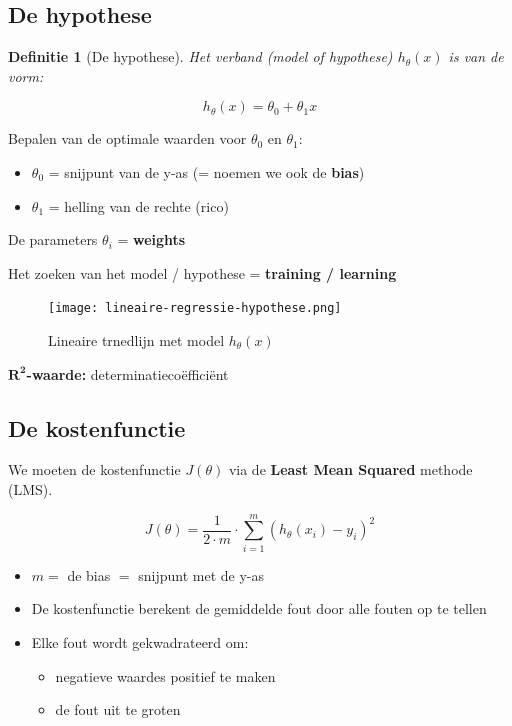 \documentclass{article}
\newtheorem{theorem}{Definitie}[section]
\begin{document}
\subsection{De hypothese}

\begin{theorem}[De hypothese]
Het verband (model of hypothese) $h_{\theta}(x)$ is van de vorm:

\begin{equation}
h_{\theta}(x) = \theta_0 + \theta_1x
\end{equation}
\end{theorem}

Bepalen van de optimale waarden voor $\theta_0$ en $\theta_1$:

\begin{itemize}
    \item $\theta_0$ = snijpunt van de y-as (= noemen we ook de \textbf{bias})
    \item $\theta_1$ = helling van de rechte (rico)
\end{itemize}

De parameters $\theta_i$ = \textbf{weights}

Het zoeken van het model / hypothese = \textbf{training / learning}

\begin{figure}[H]
    \centering
    \texttt{[image: lineaire-regressie-hypothese.png]}
    \caption{Lineaire trnedlijn met model $h_{\theta}(x)$}
\end{figure}

$\mathbf{R^2}$\textbf{-waarde:} determinatiecoëfficiënt

\subsection{De kostenfunctie}

We moeten de kostenfunctie $J(\theta)$ via de \textbf{Least Mean Squared} methode (LMS). 

\begin{equation}
J(\theta) = \frac{1}{2\cdot m} \cdot \sum_{i=1}^m (h_{\theta}(x_i) - y_i)^2
\end{equation}

\begin{itemize}
    \item $m =$ de bias $=$ snijpunt met de y-as
    \item De kostenfunctie berekent de gemiddelde fout door alle fouten op te tellen
    \item Elke fout wordt gekwadrateerd om:
    \begin{itemize}
        \item negatieve waardes positief te maken
        \item de fout uit te groten
    \end{itemize}
\end{itemize}
\end{document}
